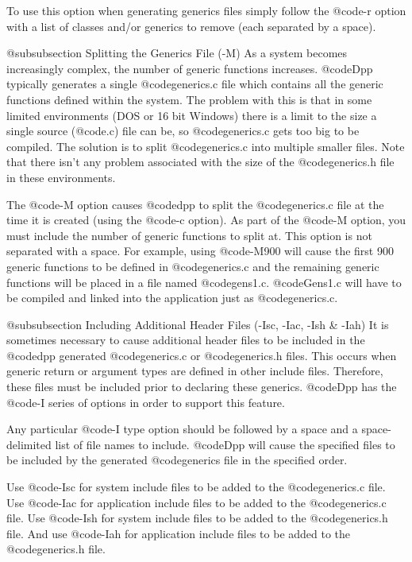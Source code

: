 To use this option when generating generics files simply follow the
@code{-r} option with a list of classes and/or generics to remove (each
separated by a space).

@subsubsection Splitting the Generics File (-M)
As a system becomes increasingly complex, the number of generic functions
increases.  @code{Dpp} typically generates a single @code{generics.c}
file which contains all the generic functions defined within the system.
The problem with this is that in some limited environments (DOS or 16
bit Windows) there is a limit to the size a single source (@code{.c})
file can be, so @code{generics.c} gets too big to be compiled.  The
solution is to split @code{generics.c} into multiple smaller files. Note
that there isn't any problem associated with the size of the
@code{generics.h} file in these environments.

The @code{-M} option causes @code{dpp} to split the @code{generics.c}
file at the time it is created (using the @code{-c} option).  As part
of the @code{-M} option, you must include the number of generic functions
to split at.  This option is not separated with a space.  For example,
using @code{-M900} will cause the first 900 generic functions to be
defined in @code{generics.c} and the remaining generic functions will
be placed in a file named @code{gens1.c}.  @code{Gens1.c} will have to
be compiled and linked into the application just as @code{generics.c}.

@subsubsection Including Additional Header Files (-Isc, -Iac, -Ish & -Iah)
It is sometimes necessary to cause additional header files to be
included in the @code{dpp} generated @code{generics.c} or
@code{generics.h} files.  This occurs when generic return or argument
types are defined in other include files.  Therefore, these files must
be included prior to declaring these generics.  @code{Dpp} has the
@code{-I} series of options in order to support this feature.

Any particular @code{-I} type option should be followed by a space and
a space-delimited list of file names to include.  @code{Dpp} will cause
the specified files to be included by the generated @code{generics}
file in the specified order.

Use @code{-Isc} for system include files to be added to the
@code{generics.c} file.  Use @code{-Iac} for application include files
to be added to the @code{generics.c} file.  Use @code{-Ish} for system
include files to be added to the @code{generics.h} file. And use
@code{-Iah} for application include files to be added to the
@code{generics.h} file.

